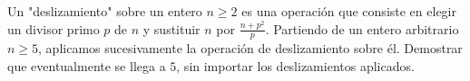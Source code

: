 Un "deslizamiento" sobre un entero $n\geq 2$ es una operación que consiste en elegir un divisor primo $p$ de $n$ y sustituir $n$ por $\frac{n+p^2}{p}.$ 
Partiendo de un entero arbitrario $n\geq 5$, aplicamos sucesivamente la operación de deslizamiento sobre él. Demostrar que eventualmente se llega a $5$, sin importar los deslizamientos aplicados.
